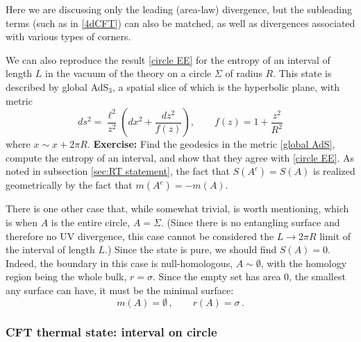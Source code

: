 \documentclass[11pt]{article}
\begin{document}
Here we are discussing only the leading (area-law) divergence, but the subleading terms (such as in \eqref{4dCFT}) can also be matched, as well as divergences associated with various types of corners.

We can also reproduce the result \eqref{circle EE} for the entropy of an interval of length $L$ in the vacuum of the theory on a circle $\Sigma$ of radius $R$. This state is described by global AdS$_3$, a spatial slice of which is the hyperbolic plane, with metric 
\begin{equation}\label{global AdS}
ds^2 = \frac{\ell^2}{z^2}\left(dx^2+\frac{dz^2}{f(z)}\right),\qquad
f(z) = 1+\frac{z^2}{R^2}
\end{equation}
where $x\sim x+2\pi R$. {\bf Exercise:} Find the geodesics in the metric \eqref{global AdS}, compute the entropy of an interval, and show that they agree with \eqref{circle EE}. As noted in subsection \ref{sec:RT statement}, the fact that $S(A^c)=S(A)$ is realized geometrically by the fact that $m(A^c)=-m(A)$.

There is one other case that, while somewhat trivial, is worth mentioning, which is when $A$ is the entire circle, $A=\Sigma$. (Since there is no entangling surface and therefore no UV divergence, this case cannot be considered the $L\to2\pi R$ limit of the interval of length $L$.) Since the state is pure, we should find $S(A)=0$. Indeed, the boundary in this case is null-homologous, $A\sim\emptyset$, with the homology region being the whole bulk, $r=\sigma$. Since the empty set has area 0, the smallest any surface can have, it must be the minimal surface:
\begin{equation}\label{empty}
m(A) = \emptyset\,,\qquad r(A) = \sigma\,.
\end{equation}




\subsubsection{CFT thermal state: interval on circle}
\label{sec:CFT thermal}
\end{document}
